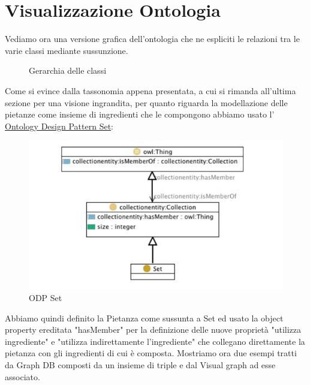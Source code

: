 \documentclass[12pt]{article}
\begin{document}
\section{Visualizzazione Ontologia}
    Vediamo ora una versione grafica dell'ontologia che ne espliciti le relazioni tra le varie classi mediante sussunzione.
    \begin{figure}[H]
        \caption{Gerarchia delle classi}
    \end{figure}
    Come si evince dalla tassonomia appena presentata, a cui si rimanda all'ultima sezione per una visione ingrandita, per quanto riguarda la modellazione delle pietanze come insieme di ingredienti che le compongono abbiamo usato l' \href{http://ontologydesignpatterns.org/wiki/Submissions:Set}{Ontology Design Pattern Set}:
    \begin{figure}[H]
        \centering
          \includegraphics[width=12cm]{files/ODPSet.png}
        \caption{ODP Set}
    \end{figure}
    Abbiamo quindi definito la Pietanza come sussunta a Set ed usato la object property ereditata "hasMember" per la definizione delle nuove proprietà "utilizza ingrediente" e "utilizza indirettamente l'ingrediente" che collegano direttamente la pietanza con gli ingredienti di cui è composta.
    \newline
    Mostriamo ora due esempi tratti da Graph DB composti da un insieme di triple e dal Visual graph ad esse associato.
\end{document}
